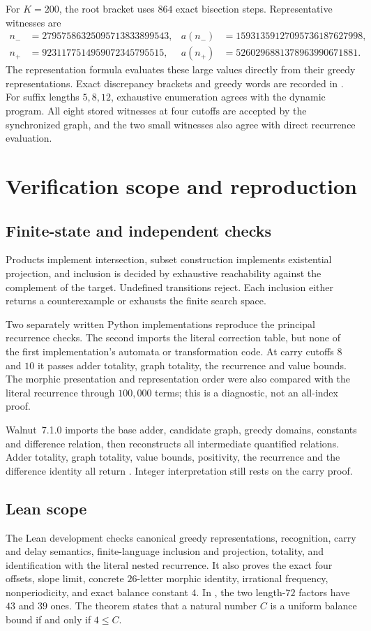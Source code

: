 For $K=200$, the root bracket uses $864$ exact bisection steps.
Representative witnesses are
\begin{align*}
 n_-&=27957586325095713833899543,&
 a(n_-)&=15931359127095736187627998,\\
 n_+&=9231177514959072345795515,&
 a(n_+)&=5260296881378963990671881.
\end{align*}
The representation formula evaluates these large values directly from
their greedy representations. Exact discrepancy brackets
and greedy words are recorded in .
For suffix lengths $5,8,12$, exhaustive enumeration agrees with the
dynamic program. All eight stored witnesses at four cutoffs are accepted
by the synchronized graph, and the two small witnesses also agree with
direct recurrence evaluation.

\section{Verification scope and reproduction}
\subsection{Finite-state and independent checks}
Products implement intersection, subset construction implements
existential projection, and inclusion is decided by exhaustive reachability
against the complement of the target. Undefined transitions reject.
Each inclusion either returns a counterexample or exhausts the finite
search space.

Two separately written Python implementations reproduce the principal
recurrence checks. The second imports the literal correction table,
but none of the first implementation's automata or transformation code.
At carry cutoffs $8$ and $10$ it passes adder totality, graph totality,
the recurrence and value bounds. The morphic presentation and representation
order were also compared with the literal recurrence through $100{,}000$
terms; this is a diagnostic, not an all-index proof.

Walnut~7.1.0 imports the base adder, candidate graph, greedy domains,
constants and difference relation, then reconstructs all intermediate
quantified relations. Adder totality, graph totality, value bounds,
positivity, the recurrence and the difference identity all return
. Integer interpretation still rests on the carry proof.

\subsection{Lean scope}
The Lean development checks canonical greedy representations, recognition,
carry and delay semantics, finite-language inclusion and projection,
totality, and identification with the literal nested recurrence. It also
proves the exact four offsets, slope limit, concrete $26$-letter morphic
identity, irrational frequency, nonperiodicity, and exact balance constant
$4$. In , the two length-$72$
factors have $43$ and $39$ ones. The theorem  states
that a natural number $C$ is a uniform balance bound if and only if $4\le C$.

